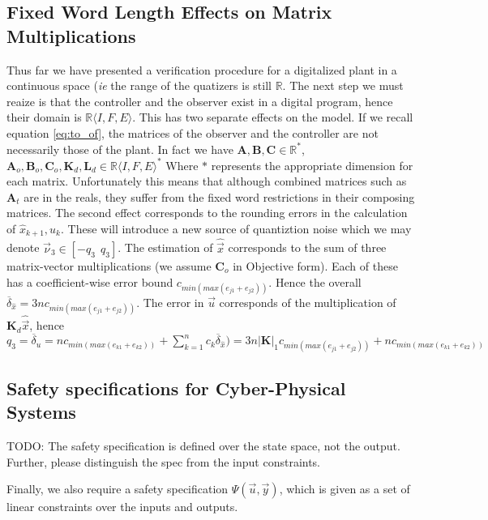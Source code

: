 \documentclass[runningheads,a4paper]{llncs}
\newcommand{\todo}[1]{{\color{red} TODO: #1}}
\newcommand{\mat}[1]{\boldsymbol{#1}}
\begin{document}
\subsection{Fixed Word Length Effects on Matrix Multiplications}
\label{sec:cof_fwl}
Thus far we have presented a verification procedure for a digitalized plant in a continuous space (\emph{ie} the
range of the quatizers is still $\mathbb{R}$. The next step we must reaize is that the controller and the observer
exist in a digital program, hence their domain is $\mathbb{R}\langle I,F,E\rangle$. This has two separate effects
on the model. If we recall equation \eqref{eq:to_of}, the matrices of the observer and the controller  are not necessarily those of the plant.
In fact we have $\mat{A},\mat{B},\mat{C} \in \mathbb{R}^*$, $\mat{A}_o,\mat{B}_o,\mat{C}_o, \mat{K}_d, \mat{L}_d \in \mathbb{R}\langle I,F,E\rangle^*$
Where $*$ represents the appropriate dimension for each matrix.
Unfortunately this means that although combined matrices such as $\mat{A}_t$ are in the reals, they suffer from
the fixed word restrictions in their composing matrices.
The second effect corresponds to the rounding errors in the calculation of $\hat{x}_{k+1}, u_k$. These will introduce a new source of quantiztion noise which we may denote $\vec{\nu}_3 \in [-q_3\ \ q_3]$.
The estimation of $\hat{\vec{x}}$ corresponds to the sum of three matrix-vector multiplications (we assume $\mat{C}_o$ in Objective form). Each of these has a coefficient-wise error bound $c_{min(max(e_{j1}+e_{j2}))}$. Hence the overall $\overline{\delta}_{\hat{x}}=3nc_{min(max(e_{j1}+e_{j2}))}$. The error in $\vec{u}$ corresponds of the multiplication of $\mat{K}_d\hat{\vec{x}}$, hence $q_3=\overline{\delta}_u=nc_{min(max(e_{k1}+e_{k2}))}+\sum_{k=1}^nc_k\overline{\delta}_{\hat{x}})=3n|\mat{K}|_1c_{min(max(e_{j1}+e_{j2}))}+nc_{min(max(e_{k1}+e_{k2}))}$


\subsection{Safety specifications for Cyber-Physical Systems}
\label{ssec:safety}

\todo{The safety specification is defined over the state space, not the output. Further, please distinguish the spec from the input constraints. }

Finally, we also require a safety specification $\Psi(\vec{u},\vec{y})$, which is
given as a set of linear constraints over the inputs and outputs.
\end{document}

